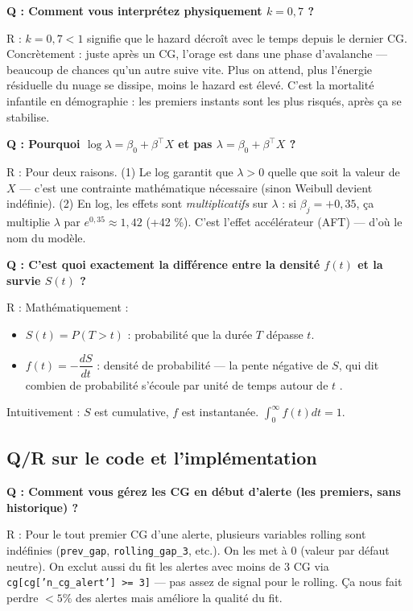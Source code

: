 \documentclass[11pt,a4paper]{article}
\begin{document}
\begin{piege}
\textbf{Q : Comment vous interprétez physiquement $k = 0{,}7$ ?}

R : $k = 0{,}7 < 1$ signifie que le hazard décroît avec le temps depuis le dernier CG.
Concrètement : juste après un CG, l'orage est dans une \og phase d'avalanche \fg{} —
beaucoup de chances qu'un autre suive vite. Plus on attend, plus l'énergie résiduelle du
nuage se dissipe, moins le hazard est élevé. C'est la \og mortalité infantile \fg{} en
démographie : les premiers instants sont les plus risqués, après ça se stabilise.
\end{piege}

\begin{piege}
\textbf{Q : Pourquoi $\log \lambda = \beta_0 + \beta^\top X$ et pas $\lambda = \beta_0 + \beta^\top X$ ?}

R : Pour deux raisons. (1) Le log garantit que $\lambda > 0$ quelle que soit la valeur
de $X$ — c'est une contrainte mathématique nécessaire (sinon Weibull devient indéfinie).
(2) En log, les effets sont \emph{multiplicatifs} sur $\lambda$ : si $\beta_j = +0{,}35$,
ça multiplie $\lambda$ par $e^{0,35} \approx 1{,}42$ (+42 \%). C'est l'effet
\og accélérateur \fg{} (AFT) — d'où le nom du modèle.
\end{piege}

\begin{piege}
\textbf{Q : C'est quoi exactement la différence entre la densité $f(t)$ et la survie $S(t)$ ?}

R : Mathématiquement :
\begin{itemize}[topsep=2pt]
    \item $S(t) = P(T > t)$ : probabilité que la durée $T$ dépasse $t$.
    \item $f(t) = -\dfrac{dS}{dt}$ : densité de probabilité — la \og pente \fg{} négative
    de $S$, qui dit \og combien de probabilité s'écoule par unité de temps autour de $t$ \fg{}.
\end{itemize}
Intuitivement : $S$ est cumulative, $f$ est instantanée. $\int_0^\infty f(t) dt = 1$.
\end{piege}

\subsection*{Q/R sur le code et l'implémentation}

\begin{piege}
\textbf{Q : Comment vous gérez les CG en début d'alerte (les premiers, sans historique) ?}

R : Pour le tout premier CG d'une alerte, plusieurs variables rolling sont indéfinies
(\texttt{prev\_gap}, \texttt{rolling\_gap\_3}, etc.). On les met à 0 (valeur par défaut
neutre). On exclut aussi du fit les alertes avec moins de 3 CG via
\texttt{cg[cg['n\_cg\_alert'] >= 3]} — pas assez de signal pour le rolling. Ça nous fait
perdre $< 5\%$ des alertes mais améliore la qualité du fit.
\end{piege}
\end{document}
